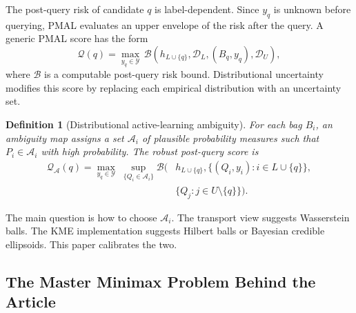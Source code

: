 \documentclass[10pt,journal]{IEEEtran}
\newtheorem{definition}{Definition}
\newcommand{\Ycal}{\mathcal{Y}}
\newcommand{\Dcal}{\mathcal{D}}
\begin{document}
The post-query risk of candidate $q$ is label-dependent. Since $y_q$ is unknown before querying, PMAL evaluates an upper envelope of the risk after the query. A generic PMAL score has the form
\begin{equation}
\label{eq:generic-pmal}
    \mathcal{Q}(q)=\max_{y_q\in\Ycal}\,\mathcal{B}\left(h_{L\cup\{q\}},\Dcal_L,(B_q,y_q),\Dcal_U\right),
\end{equation}
where $\mathcal{B}$ is a computable post-query risk bound. Distributional uncertainty modifies this score by replacing each empirical distribution with an uncertainty set.

\begin{definition}[Distributional active-learning ambiguity]
For each bag $B_i$, an ambiguity map assigns a set $\mathcal{A}_i$ of plausible probability measures such that $P_i\in\mathcal{A}_i$ with high probability. The robust post-query score is
\begin{equation}
\label{eq:robust-score-general}
\begin{aligned}
\mathcal{Q}_{\mathcal{A}}(q)
= \max_{y_q\in\Ycal}\;
  \sup_{\{Q_i\in\mathcal{A}_i\}}
  \mathcal{B}\big(&h_{L\cup\{q\}},
  \{(Q_i,y_i):i\in L\cup\{q\}\},\\
  &\{Q_j:j\in U\setminus\{q\}\}\big).
\end{aligned}
\end{equation}
\end{definition}

The main question is how to choose $\mathcal{A}_i$. The transport view suggests Wasserstein balls. The KME implementation suggests Hilbert balls or Bayesian credible ellipsoids. This paper calibrates the two.

\subsection{The Master Minimax Problem Behind the Article}
\label{subsec:master-game}
\end{document}
